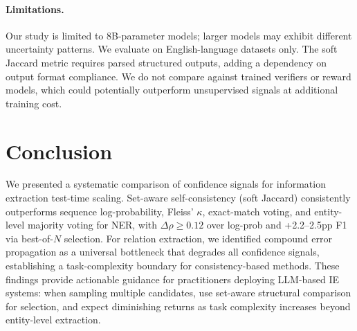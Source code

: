 \documentclass[11pt,a4paper]{article}
\begin{document}
\paragraph{Limitations.}
Our study is limited to 8B-parameter models; larger models may exhibit different uncertainty patterns. We evaluate on English-language datasets only. The soft Jaccard metric requires parsed structured outputs, adding a dependency on output format compliance. We do not compare against trained verifiers or reward models, which could potentially outperform unsupervised signals at additional training cost.

\section{Conclusion}
\label{sec:conclusion}

We presented a systematic comparison of confidence signals for information extraction test-time scaling. Set-aware self-consistency (soft Jaccard) consistently outperforms sequence log-probability, Fleiss' $\kappa$, exact-match voting, and entity-level majority voting for NER, with $\Delta\rho \geq 0.12$ over log-prob and +2.2--2.5pp F1 via best-of-$N$ selection. For relation extraction, we identified compound error propagation as a universal bottleneck that degrades all confidence signals, establishing a task-complexity boundary for consistency-based methods. These findings provide actionable guidance for practitioners deploying LLM-based IE systems: when sampling multiple candidates, use set-aware structural comparison for selection, and expect diminishing returns as task complexity increases beyond entity-level extraction.
\end{document}
